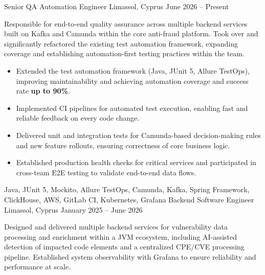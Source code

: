 \renewcommand{\labelitemi}{$\bullet$}
\begin{works}
    \work
    {Senior QA Automation Engineer} {} {Limassol, Cyprus} {June 2026 -- Present}
    {
        Responsible for end-to-end quality assurance across multiple backend services built on Kafka and Camunda within the core anti-fraud platform. Took over and significantly refactored the existing test automation framework, expanding coverage and establishing automation-first testing practices within the team.
        \begin{itemize}
            \item {
                Extended the test automation framework (Java, JUnit 5, Allure TestOps), improving maintainability and achieving automation coverage and success rate \textbf{up to 90\%}.
            }
            \item {
                Implemented CI pipelines for automated test execution, enabling fast and reliable feedback on every code change.
            }
            \item {
                Delivered unit and integration tests for Camunda-based decision-making rules and new feature rollouts, ensuring correctness of core business logic.
            }
            \item {
                Established production health checks for critical services and participated in cross-team E2E testing to validate end-to-end data flows.
            }
        \end{itemize}
    }
    {
        Java, JUnit 5, Mockito, Allure TestOps, Camunda, Kafka, Spring Framework, ClickHouse, AWS, GitLab CI, Kubernetes, Grafana
    }
    \work
        {Backend Software Engineer} {} {Limassol, Cyprus} {January 2025 -- June 2026}
        {
            Designed and delivered multiple backend services for vulnerability data processing and enrichment within a JVM ecosystem, \mbox{including} AI-assisted detection of impacted code elements and a centralized CPE/CVE processing pipeline. Established system observability with Grafana to ensure reliability and performance at scale.
        
}
\end{works}

